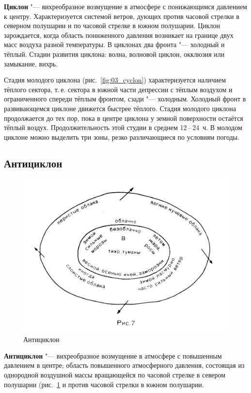 \documentclass[a4paper, 12pt, twoside, final, book, russian, fittopage, cyremdash, openright]{ncc}
\newcommand{\otdo}{\,--\,}
\begin{document}
\textbf{Циклон} "--- вихреобразное возмущение в
атмосфере с понижающимся давлением к центру. Характеризуется системой
ветров, дующих против часовой стрелки в северном полушарии и по
часовой стрелке в южном полушарии. Циклон зарождается, когда область
пониженного давления возникает на границе двух масс воздуха разной
температуры. В циклонах два фронта "--- холодный и тёплый. Стадии
развития циклона: волна, волновой циклон, окклюзия или замыкание,
вихрь.

Стадия молодого циклона (рис.~\ref{fig:03_cyclon}) характеризуется
наличием тёплого сектора, т.\,е. сектора в южной части депрессии с
тёплым воздухом и ограниченного спереди тёплым фронтом, сзади "---
холодным. Холодный фронт в развивающемся циклоне движется быстрее
тёплого. Стадия молодого циклона продолжается до тех пор, пока в
центре циклона у земной поверхности остаётся тёплый
воздух. Продолжительность этой студии в среднем 12\otdo24~ч. В молодом
циклоне можно выделить три зоны, резко различающиеся по условиям
погоды.

\subsection{Антициклон}
\label{sec:anticyclon}

\begin{figure}[htb]
   \centering
   \includegraphics[scale=1.0]{04_anticyclon.pdf}
   \caption{Антициклон}
   \label{fig:04_anticyclon}
\end{figure}

\textbf{Антициклон} "--- вихреобразное возмущение в
атмосфере с повышенным давлением в центре; область повышенного
атмосферного давления, состоящая из однородной воздушной массы
вращающейся по часовой стрелке в севером полушарии
(рис.~\ref{fig:04_anticyclon} и против часовой стрелки в южном
полушарии.
\end{document}
